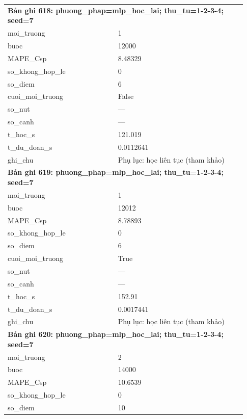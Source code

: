 \begin{longtable}{p{0.43\linewidth}p{0.50\linewidth}}
\midrule
\multicolumn{2}{p{0.95\linewidth}}{\textbf{Bản ghi 618: phuong\_phap=mlp\_hoc\_lai; thu\_tu=1-2-3-4; seed=7}} \\
moi\_\allowbreak truong & 1 \\
buoc & 12000 \\
MAPE\_\allowbreak Csp & 8.48329 \\
so\_\allowbreak khong\_\allowbreak hop\_\allowbreak le & 0 \\
so\_\allowbreak diem & 6 \\
cuoi\_\allowbreak moi\_\allowbreak truong & False \\
so\_\allowbreak nut & — \\
so\_\allowbreak canh & — \\
t\_\allowbreak hoc\_\allowbreak s & 121.019 \\
t\_\allowbreak du\_\allowbreak doan\_\allowbreak s & 0.0112641 \\
ghi\_\allowbreak chu & Phụ lục: học liên tục (tham khảo) \\
\midrule
\multicolumn{2}{p{0.95\linewidth}}{\textbf{Bản ghi 619: phuong\_phap=mlp\_hoc\_lai; thu\_tu=1-2-3-4; seed=7}} \\
moi\_\allowbreak truong & 1 \\
buoc & 12012 \\
MAPE\_\allowbreak Csp & 8.78893 \\
so\_\allowbreak khong\_\allowbreak hop\_\allowbreak le & 0 \\
so\_\allowbreak diem & 6 \\
cuoi\_\allowbreak moi\_\allowbreak truong & True \\
so\_\allowbreak nut & — \\
so\_\allowbreak canh & — \\
t\_\allowbreak hoc\_\allowbreak s & 152.91 \\
t\_\allowbreak du\_\allowbreak doan\_\allowbreak s & 0.0017441 \\
ghi\_\allowbreak chu & Phụ lục: học liên tục (tham khảo) \\
\midrule
\multicolumn{2}{p{0.95\linewidth}}{\textbf{Bản ghi 620: phuong\_phap=mlp\_hoc\_lai; thu\_tu=1-2-3-4; seed=7}} \\
moi\_\allowbreak truong & 2 \\
buoc & 14000 \\
MAPE\_\allowbreak Csp & 10.6539 \\
so\_\allowbreak khong\_\allowbreak hop\_\allowbreak le & 0 \\
so\_\allowbreak diem & 10 \\

\end{longtable}
